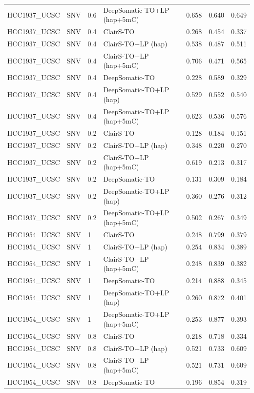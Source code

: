 \documentclass[pdflatex,sn-nature]{sn-jnl}
\begin{document}
{\begin{longtable}{@{}llllccc@{}}
  HCC1937\_UCSC & SNV & 0.6 & DeepSomatic-TO+LP (hap+5mC) & 0.658 & 0.640 & 0.649 \\
  HCC1937\_UCSC & SNV & 0.4 & ClairS-TO & 0.268 & 0.454 & 0.337 \\
  HCC1937\_UCSC & SNV & 0.4 & ClairS-TO+LP (hap) & 0.538 & 0.487 & 0.511 \\
  HCC1937\_UCSC & SNV & 0.4 & ClairS-TO+LP (hap+5mC) & 0.706 & 0.471 & 0.565 \\
  HCC1937\_UCSC & SNV & 0.4 & DeepSomatic-TO & 0.228 & 0.589 & 0.329 \\
  HCC1937\_UCSC & SNV & 0.4 & DeepSomatic-TO+LP (hap) & 0.529 & 0.552 & 0.540 \\
  HCC1937\_UCSC & SNV & 0.4 & DeepSomatic-TO+LP (hap+5mC) & 0.623 & 0.536 & 0.576 \\
  HCC1937\_UCSC & SNV & 0.2 & ClairS-TO & 0.128 & 0.184 & 0.151 \\
  HCC1937\_UCSC & SNV & 0.2 & ClairS-TO+LP (hap) & 0.348 & 0.220 & 0.270 \\
  HCC1937\_UCSC & SNV & 0.2 & ClairS-TO+LP (hap+5mC) & 0.619 & 0.213 & 0.317 \\
  HCC1937\_UCSC & SNV & 0.2 & DeepSomatic-TO & 0.131 & 0.309 & 0.184 \\
  HCC1937\_UCSC & SNV & 0.2 & DeepSomatic-TO+LP (hap) & 0.360 & 0.276 & 0.312 \\
  HCC1937\_UCSC & SNV & 0.2 & DeepSomatic-TO+LP (hap+5mC) & 0.502 & 0.267 & 0.349 \\
  HCC1954\_UCSC & SNV & 1 & ClairS-TO & 0.248 & 0.799 & 0.379 \\
  HCC1954\_UCSC & SNV & 1 & ClairS-TO+LP (hap) & 0.254 & 0.834 & 0.389 \\
  HCC1954\_UCSC & SNV & 1 & ClairS-TO+LP (hap+5mC) & 0.248 & 0.839 & 0.382 \\
  HCC1954\_UCSC & SNV & 1 & DeepSomatic-TO & 0.214 & 0.888 & 0.345 \\
  HCC1954\_UCSC & SNV & 1 & DeepSomatic-TO+LP (hap) & 0.260 & 0.872 & 0.401 \\
  HCC1954\_UCSC & SNV & 1 & DeepSomatic-TO+LP (hap+5mC) & 0.253 & 0.877 & 0.393 \\
  HCC1954\_UCSC & SNV & 0.8 & ClairS-TO & 0.218 & 0.718 & 0.334 \\
  HCC1954\_UCSC & SNV & 0.8 & ClairS-TO+LP (hap) & 0.521 & 0.733 & 0.609 \\
  HCC1954\_UCSC & SNV & 0.8 & ClairS-TO+LP (hap+5mC) & 0.521 & 0.731 & 0.609 \\
  HCC1954\_UCSC & SNV & 0.8 & DeepSomatic-TO & 0.196 & 0.854 & 0.319 \\

\end{longtable}}
\end{document}
